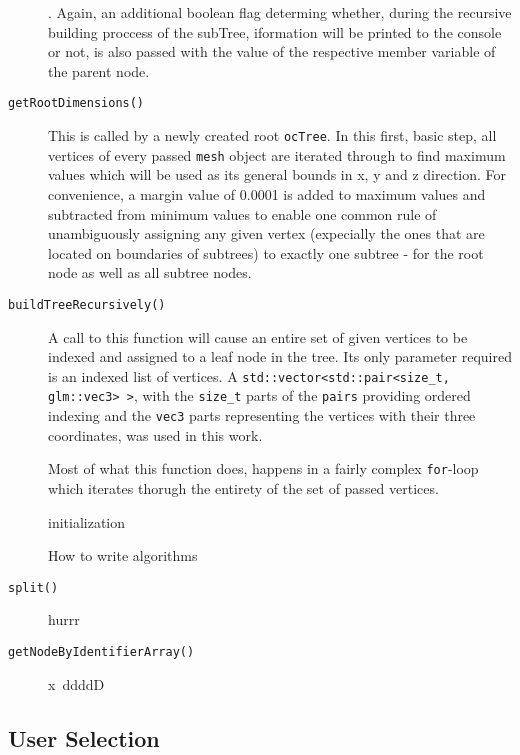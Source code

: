 \begin{description}
\begin{enumerate*}
	\end{enumerate*}.
	Again, an additional boolean flag determing whether, during the recursive building proccess of the subTree, iformation will be printed to the console or not, is also passed with the value of the respective member variable of the parent node.
	\item[\texttt{getRootDimensions()}] This is called by a newly created root \texttt{ocTree}. In this first, basic step, all vertices of every passed \texttt{mesh} object are iterated through to find maximum values which will be used as its general bounds in x, y and z direction. For convenience, a margin value of 0.0001 is added to maximum values and subtracted from minimum values to enable one common rule of unambiguously assigning any given vertex (expecially the ones that are located on boundaries of subtrees) to exactly one subtree - for the root node as well as all subtree nodes.
	\item[\texttt{buildTreeRecursively()}] A call to this function will cause an entire set of given vertices to be indexed and assigned to a leaf node in the tree. Its only parameter required is an indexed list of vertices. A \texttt{std::vector<std::pair<size\_t, glm::vec3> >}, with the \texttt{size\_t} parts of the \texttt{pairs} providing ordered indexing and the \texttt{vec3} parts representing the vertices with their three coordinates, was used in this work. 

	Most of what this function does, happens in a fairly complex \texttt{for}-loop which iterates thorugh the entirety of the set of passed vertices.

\begin{algorithm}[H]
 initialization\;
 \caption{How to write algorithms}
\end{algorithm}

	\item[\texttt{split()}] hurrr
	\item[\texttt{getNodeByIdentifierArray()}] x~ddddD
\end{description}
 


\subsection{User Selection}
\label{sec:user_selection}

